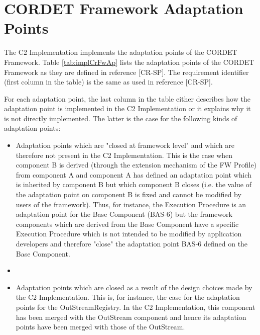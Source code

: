 \documentclass{pnp_article}
\begin{document}
\begin{landscape}


\end{landscape}





\section{CORDET Framework Adaptation Points}\label{sec:implCrFwAp}
The C2 Implementation implements the adaptation points of the CORDET Framework.
Table \ref{tab:implCrFwAp} lists the adaptation points of the CORDET Framework as they are defined in reference [CR-SP]. The requirement identifier (first column in the table) is the same as used in reference [CR-SP]. 

For each adaptation point, the last column in the table either describes how the adaptation point is implemented in the C2 Implementation or it explains why it is not directly implemented. The latter is the case for the following kinds of adaptation points:

\begin{itemize}
\item Adaptation points which are "closed at framework level" and which are therefore not present in the C2 Implementation. This is the case when component B is derived (through the extension mechanism of the FW Profile) from component A and component A has defined an adaptation point which is inherited by component B but which component B closes (i.e. the value of the adaptation point on component B is fixed and cannot be modified by users of the framework). Thus, for instance, the Execution Procedure is an adaptation point for the Base Component (BAS-6) but the framework components which are derived from the Base Component have a specific Execution Procedure which is not intended to be modified by application developers and therefore "close" the adaptation point BAS-6 defined on the Base Component.
\item {}
\item Adaptation points which are closed as a result of the design choices made by the C2 Implementation. This is, for instance, the case for the adaptation points for the OutStreamRegistry. In the C2 Implementation, this component has been merged with the OutStream component and hence its adaptation points have been merged with those of the OutStream.
\end{itemize}
\end{document}
